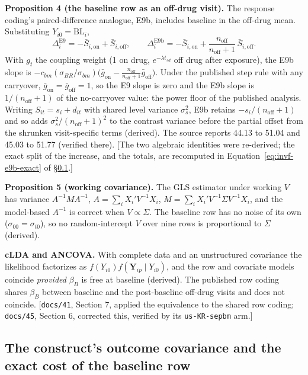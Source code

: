 \documentclass[11pt]{article}
\newcommand{\note}[1]{\textcolor{blue!60!black}{\small [#1]}}
\newcommand{\code}[1]{\texttt{#1}}
\begin{document}
\textbf{Proposition 4 (the baseline row as an off-drug visit).} The
response coding's paired-difference analogue, E9b, includes baseline in
the off-drug mean. Substituting $Y_{i0} = \mathrm{BL}_i$,
\begin{equation}
\Delta_i^{\mathrm{E9}} = -\bar S_{i,\text{on}} + \bar S_{i,\text{off}},
\qquad
\Delta_i^{\mathrm{E9b}} = -\bar S_{i,\text{on}}
  + \frac{n_{\text{off}}}{n_{\text{off}}+1}\,\bar S_{i,\text{off}} .
\label{eq:bp-e9b}
\end{equation}
With $g_t$ the coupling weight (1 on drug, $e^{-\lambda t_{sd}}$ off
drug after exposure), the E9b slope is
$-c_{bm}(\sigma_{BR}/\sigma_{bm})\big(\bar g_{\text{on}} -
\tfrac{n_{\text{off}}}{n_{\text{off}}+1}\bar g_{\text{off}}\big)$.
Under the published step rule with any carryover,
$\bar g_{\text{on}} = \bar g_{\text{off}} = 1$, so the E9 slope is zero
and the E9b slope is $1/(n_{\text{off}}+1)$ of the no-carryover value:
the power floor of the published analysis. Writing
$S_{it} = s_i + d_{it}$ with shared level variance $\sigma_s^2$, E9b
retains $-s_i/(n_{\text{off}}+1)$ and so adds
$\sigma_s^2/(n_{\text{off}}+1)^2$ to the contrast variance before the
partial offset from the shrunken visit-specific terms (derived). The
source reports 44.13 to 51.04 and 45.03 to 51.77 (verified there).
\note{The two algebraic identities were re-derived; the exact split of
the increase, and the totals, are recomputed in
Equation~\eqref{eq:invf-e9b-exact} of \S\ref{sec:invf-blcov}.}

\textbf{Proposition 5 (working covariance).} The GLS estimator under
working $V$ has variance $A^{-1}MA^{-1}$, $A = \sum_i X_i'V^{-1}X_i$,
$M = \sum_i X_i'V^{-1}\Sigma V^{-1}X_i$, and the model-based $A^{-1}$
is correct when $V \propto \Sigma$. The baseline row has no noise of
its own ($\sigma_{00} = \sigma_{t0}$), so no random-intercept $V$ over
nine rows is proportional to $\Sigma$ (derived).

\textbf{cLDA and ANCOVA.} With complete data and an unstructured
covariance the likelihood factorizes as $f(Y_{i0})f(\mathbf
Y_{ip}\mid Y_{i0})$, and the row and covariate models coincide
\emph{provided} $\beta_B$ is free at baseline (derived). The published
row coding shares $\beta_B$ between baseline and the post-baseline
off-drug visits and does not coincide. \note{\code{docs/41}, Section 7,
applied the equivalence to the shared row coding; \code{docs/45},
Section 6, corrected this, verified by its \code{us-KR-sepbm} arm.}

\subsection{The construct's outcome covariance and the exact cost of the
baseline row}
\label{sec:invf-blcov}
\end{document}
